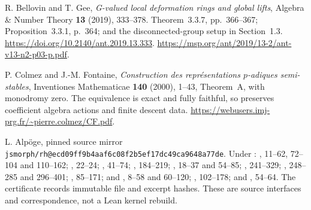 R. Bellovin and T. Gee, \emph{G-valued local deformation rings and
global lifts}, Algebra \& Number Theory \textbf{13} (2019),
333--378. Theorem~3.3.7, pp.~366--367; Proposition~3.3.1,
p.~364; and the disconnected-group setup in Section~1.3.
\url{https://doi.org/10.2140/ant.2019.13.333}.
\url{https://msp.org/ant/2019/13-2/ant-v13-n2-p03-p.pdf}.

P. Colmez and J.-M. Fontaine, \emph{Construction des repr\'esentations
$p$-adiques semi-stables}, Inventiones Mathematicae \textbf{140}
(2000), 1--43, Theorem~A, with monodromy zero.  The equivalence
is exact and fully faithful, so preserves coefficient algebra
actions and finite descent data.
\url{https://webusers.imj-prg.fr/~pierre.colmez/CF.pdf}.

L. Alp\"oge, pinned source mirror
\texttt{jsmorph/rh@ecd09ff9b4aaf6c08f2b5ef17dc49ca9648a77de}.
Under :
, 11--62,
72--104 and 110--162; ,
22--24; , 41--74;
, 184--219;
, 18--37 and 54--85;
, 241--329;
, 248--285 and 296--401;
, 85--171; and
,
8--58 and 60--120;
, 102--178; and
, 54--64.
The certificate records immutable file and excerpt hashes.  These
are source interfaces and correspondence, not a Lean kernel rebuild.
